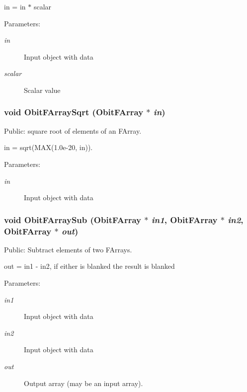 in = in $\ast$ scalar \begin{Desc}
\item[Parameters:]
\begin{description}
\item[{\em in}]Input object with data \item[{\em scalar}]Scalar value \end{description}
\end{Desc}
\subsubsection{\setlength{\rightskip}{0pt plus 5cm}void Obit\-FArray\-Sqrt ({\bf Obit\-FArray} $\ast$ {\em in})}\label{ObitFArray_8c_a39}


Public: square root of elements of an FArray. 

in = sqrt(MAX(1.0e-20, in)). \begin{Desc}
\item[Parameters:]
\begin{description}
\item[{\em in}]Input object with data \end{description}
\end{Desc}
\subsubsection{\setlength{\rightskip}{0pt plus 5cm}void Obit\-FArray\-Sub ({\bf Obit\-FArray} $\ast$ {\em in1}, {\bf Obit\-FArray} $\ast$ {\em in2}, {\bf Obit\-FArray} $\ast$ {\em out})}\label{ObitFArray_8c_a53}


Public: Subtract elements of two FArrays. 

out = in1 - in2, if either is blanked the result is blanked \begin{Desc}
\item[Parameters:]
\begin{description}
\item[{\em in1}]Input object with data \item[{\em in2}]Input object with data \item[{\em out}]Output array (may be an input array). \end{description}
\end{Desc}
